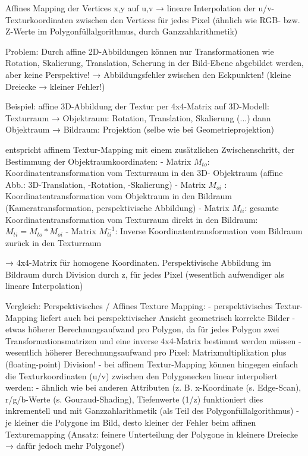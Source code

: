 \documentclass[10pt,landscape]{article}
\begin{document}
\begin{multicols}{3}
Affines Mapping der Vertices x,y auf u,v → lineare Interpolation der u/v-Texturkoordinaten zwischen den Vertices für jedes Pixel (ähnlich wie RGB- bzw. Z-Werte im Polygonfüllalgorithmus, durch Ganzzahlarithmetik)


Problem: Durch affine 2D-Abbildungen können nur Transformationen wie Rotation, Skalierung, Translation, Scherung in der Bild-Ebene abgebildet werden, aber keine Perspektive! → Abbildungsfehler zwischen den Eckpunkten! (kleine Dreiecke → kleiner Fehler!)

Beispiel: affine 3D-Abbildung der Textur per 4x4-Matrix auf 3D-Modell: 
Texturraum → Objektraum: Rotation, Translation, Skalierung (...) dann Objektraum → Bildraum: Projektion (selbe wie bei Geometrieprojektion)


entspricht affinem Textur-Mapping mit einem zusätzlichen Zwischenschritt, der Bestimmung der Objektraumkoordinaten:
- Matrix $M_{to}$: Koordinatentransformation vom Texturraum in den 3D- Objektraum (affine Abb.: 3D-Translation, -Rotation, -Skalierung)
- Matrix $M_{oi}$ : Koordinatentransformation vom Objektraum in den Bildraum (Kameratransformation, perspektivische Abbildung)
- Matrix $M_{ti}$: gesamte Koordinatentransformation vom Texturraum direkt in den Bildraum: $M_{ti} = M_{to}*M_{oi}$
- Matrix $M_{ti}^{−1}$: Inverse Koordinatentransformation vom Bildraum zurück in den Texturraum

→ 4x4-Matrix für homogene Koordinaten. Perspektivische Abbildung im Bildraum durch Division durch z, für jedes Pixel (wesentlich aufwendiger als lineare Interpolation)

Vergleich: Perspektivisches / Affines Texture Mapping:
- perspektivisches Textur-Mapping liefert auch bei perspektivischer Ansicht geometrisch korrekte Bilder
- etwas höherer Berechnungsaufwand pro Polygon, da für jedes Polygon zwei Transformationsmatrizen und eine inverse 4x4-Matrix bestimmt werden müssen
- wesentlich höherer Berechnungsaufwand pro Pixel: Matrixmultiplikation plus (floating-point) Division!
- bei affinem Textur-Mapping können hingegen einfach die Texturkoordinaten (u/v) zwischen den Polygonecken linear interpoliert werden:
  - ähnlich wie bei anderen Attributen (z. B. x-Koordinate (s. Edge-Scan), r/g/b-Werte (s. Gouraud-Shading), Tiefenwerte (1/z) funktioniert dies inkrementell und mit Ganzzahlarithmetik (als Teil des Polygonfüllalgorithmus)
  - je kleiner die Polygone im Bild, desto kleiner der Fehler beim affinen Texturemapping (Ansatz: feinere Unterteilung der Polygone in kleinere Dreiecke → dafür jedoch mehr Polygone!)


\end{multicols}
\end{document}
